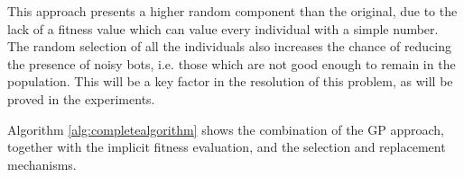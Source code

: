\documentclass[conference]{IEEEtran}
\begin{document}
This approach presents a higher random component than the
original, %
due to the lack of a fitness value which can value every individual with a simple number. The random selection of all the individuals also increases the chance of reducing the presence of noisy bots, i.e. those which are not good enough to remain in the population.
This will be a key factor in the resolution of this problem, as will be proved in the experiments.



Algorithm \ref{alg:completealgorithm} shows the combination of the GP approach, together with the implicit fitness evaluation, and the selection and replacement mechanisms.
\end{document}
